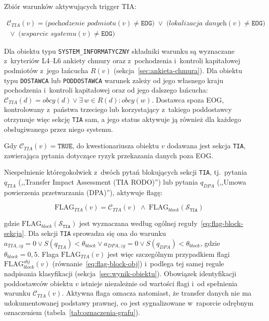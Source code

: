 Zbiór warunków aktywujących trigger TIA:

\begin{multline}
\mathcal{C}_{TIA}(v) =
\bigl(\textit{pochodzenie podmiotu}(v) \neq \texttt{EOG}\bigr)
\;\vee\;
\bigl(\textit{lokalizacja danych}(v) \neq \texttt{EOG}\bigr) \\
\;\vee\;
\bigl(\textit{wsparcie systemu}(v) \neq \texttt{EOG}\bigr)
\label{eq:ctia}
\end{multline}


\noindent Dla obiektu typu \texttt{SYSTEM\_INFORMATYCZNY} składniki warunku są wyznaczane z~kryteriów L4--L6 ankiety chmury oraz z~pochodzenia i~kontroli kapitałowej podmiotów z~jego łańcucha $R(v)$ (sekcja~\ref{sec:ankieta-chmura}). Dla obiektu typu \texttt{DOSTAWCA} lub \texttt{PODDOSTAWCA} warunek zależy od jego własnego kraju pochodzenia i~kontroli kapitałowej oraz od jego dalszego łańcucha: $\mathcal{C}_{TIA}(d) = \textit{obcy}(d) \vee \exists\, w \in R(d) : \textit{obcy}(w)$. Dostawca spoza EOG, kontrolowany z~państwa trzeciego lub korzystający z~takiego poddostawcy otrzymuje więc sekcję \texttt{TIA} sam, a jego status aktywuje ją również dla każdego obsługiwanego przez niego systemu.

Gdy $\mathcal{C}_{TIA}(v) = \texttt{TRUE}$,
do kwestionariusza obiektu $v$ dodawana jest sekcja \texttt{TIA}, zawierająca pytania dotyczące ryzyk przekazania danych poza EOG.
\\

\medskip
\noindent Niespełnienie któregokolwiek z~dwóch pytań blokujących sekcji \texttt{TIA}, tj.\ pytania $q_{TIA}$ (,,Transfer Impact Assessment (TIA RODO)'') lub pytania $q_{DPA}$ (,,Umowa powierzenia przetwarzania (DPA)''), aktywuje flagę:

\begin{equation}
\text{FLAG}_{TIA}(v) =
\mathcal{C}_{TIA}(v)
\;\wedge\;
\text{FLAG}_{block}(\mathcal{S}_{\texttt{TIA}})
\label{eq:flag-tia}
\end{equation}

\noindent gdzie $\text{FLAG}_{block}(\mathcal{S}_{\texttt{TIA}})$ jest wyznaczana według ogólnej reguły~\eqref{eq:flag-block-sekcja}. Dla sekcji \texttt{TIA} sprowadza się ona do warunku
$a_{TIA,zg} = 0 \vee S(q_{TIA}) < \theta_{block} \vee a_{DPA,zg} = 0 \vee S(q_{DPA}) < \theta_{block}$, gdzie $\theta_{block} = 0{,}5$.
Flaga $\text{FLAG}_{TIA}(v)$ jest więc szczególnym przypadkiem flagi $\text{FLAG}_{block}^{obj}(v)$ (równanie~\eqref{eq:flag-block-obj}) i~podlega tej samej regule nadpisania klasyfikacji (sekcja~\ref{sec:wynik-obiektu}). Obowiązek identyfikacji poddostawców obiektu $v$ istnieje niezależnie od wartości flagi i~od spełnienia warunku $\mathcal{C}_{TIA}(v)$. Aktywna flaga oznacza natomiast, że transfer danych nie ma udokumentowanej podstawy prawnej, co jest sygnalizowane w~raporcie odrębnym oznaczeniem (tabela~\ref{tab:oznaczenia-grafu}).

